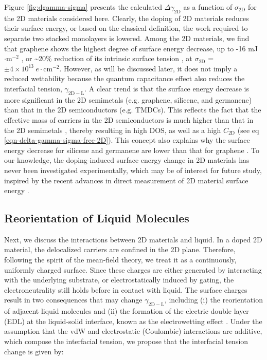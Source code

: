 \documentclass[journal=ancac3,manuscript=article,email=true,hyperref=true,keywords=true]{achemso}
\begin{document}
Figure \ref{fig:dgamma-sigma} presents the calculated \(\Delta
\gamma_{\mathrm{2D}}\) as a function of \(\sigma_{\mathrm{2D}}\) for the
2D materials considered here. Clearly, the doping of 2D materials
reduces their surface energy, or based on the classical definition,
the work required to separate two stacked monolayers is lowered. Among
the 2D materials, we find that graphene shows the highest degree of
surface energy decrease, up to -16 mJ\(\cdot \mathrm{m}^{-2}\) , or \textasciitilde{}20\%
reduction of its intrinsic surface tension \cite{shih_wetting_2013}, at
\(\sigma_{\mathrm{2D}}\) = \(\pm 4\times10^{13}\ e\cdot
\mathrm{cm}^{-2}\). However, as will be discussed later, it does not
imply a reduced wettability because the quantum capacitance effect
also reduces the interfacial tension, \(\gamma_{\mathrm{2D-L}}\). A
clear trend is that the surface energy decrease is more significant in
the 2D semimetals (e.g. graphene, silicene, and germanene) than that
in the 2D semiconductors (e.g. TMDCs). This reflects the fact that the
effective mass of carriers in the 2D semiconductors is much higher
than that in the 2D semimetals \cite{davies_two-dimensional_1997},
thereby resulting in high DOS, as well as a high \(C_{\mathrm{2D}}\)
(see eq \ref{eqn-delta-gamma-sigma-free-2D}). This concept also explains
why the surface energy decrease for silicene and germanene are lower
than that for graphene \cite{Yan_2013}.  To our knowledge, the
doping-induced surface energy change in 2D materials has never been
investigated experimentally, which may be of interest for future
study, inspired by the recent advances in direct measurement of 2D
material surface energy \cite{van_Engers_2017_direct_surf_gr}.


\subsection{Reorientation of Liquid Molecules}
\label{sec:org3a835fb}

Next, we discuss the interactions between 2D materials and liquid. In
a doped 2D material, the delocalized carriers are confined in the 2D
plane. Therefore, following the spirit of the mean-field theory, we
treat it as a continuously, uniformly charged surface. Since these
charges are either generated by interacting with the underlying
substrate, or electrostatically induced by gating, the
electroneutrality still holds before in contact with liquid. The
surface charges result in two consequences that may change
\(\gamma_{\mathrm{2D-L}}\), including (i) the reorientation of adjacent
liquid molecules \cite{ostrowski_tunable_2014} and (ii) the formation of
the electric double layer (EDL) at the liquid-solid interface, known
as the electrowetting effect
\cite{Lippmann_1908,mugele_electrowetting:_2005}. Under the assumption
that the vdW and electrostatic (Coulombic) interactions are additive,
which compose the interfacial tension, we propose that the
interfacial tension change is given by:
\end{document}
